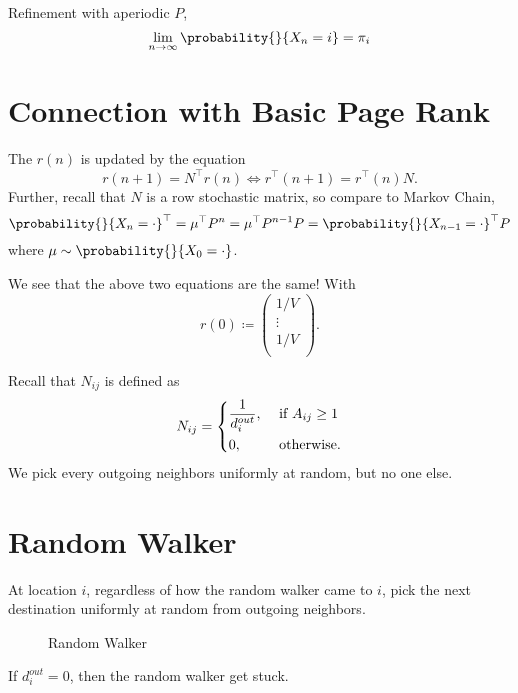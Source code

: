 Refinement with aperiodic \(P\),
\[
	\lim_{n\to \infty }\probability{}{X_n = i} = \pi_i
\]

\section{Connection with Basic Page Rank}
\begin{prev}
	The \(r(n)\) is updated by the equation
	\[
		r(n+1) = N^{\top}r(n) \iff r^{\top}(n+1) = r^{\top}(n)N.
	\]
	Further, recall that \(N\) is a row stochastic matrix, so compare to Markov Chain,
	\[
		\probability{}{X_n = \cdot}^{\top} = \mu^{\top}P^n = \mu^{\top}P^{n-1}P = \probability{}{X_{n-1} = \cdot}^{\top}P
	\]
	where \(\mu\sim \probability{}{X_0 = \cdot}\).

	We see that the above two equations are the same! With
	\[
		r(0)\coloneqq \begin{pmatrix}
			1/V    \\
			\vdots \\
			1/V    \\
		\end{pmatrix}.
	\]
\end{prev}

Recall that \(N_{ij}\) is defined as
\[
	N_{ij} = \begin{dcases}
		\frac{1}{d_i^{out}}, & \text{ if }A_{ij}\geq 1 \\
		0,                   & \text{ otherwise}.
	\end{dcases}
\]
We pick every outgoing neighbors uniformly at random, but no one else.

\section{Random Walker}
\begin{intuition}
	At location \(i\), regardless of how the random walker came to \(i\), pick the next destination uniformly at random from outgoing neighbors.
\end{intuition}

\begin{figure}[H]
	\centering
	\caption{Random Walker}
	\label{fig:random-walker}
\end{figure}

\begin{note}
	If \(d_i^{out} = 0\), then the random walker get stuck.
\end{note}